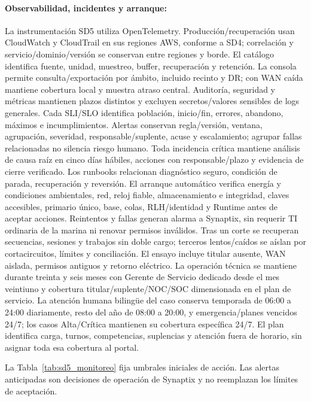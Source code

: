\paragraph{Observabilidad, incidentes y arranque:}
La instrumentación SD5 utiliza OpenTelemetry. Producción/recuperación usan CloudWatch y CloudTrail en sus regiones AWS, conforme a SD4; correlación y servicio/dominio/versión se conservan entre regiones y borde. El catálogo identifica fuente, unidad, muestreo, buffer, recuperación y retención. La consola permite consulta/exportación por ámbito, incluido recinto y DR; con WAN caída mantiene cobertura local y muestra atraso central. Auditoría, seguridad y métricas mantienen plazos distintos y excluyen secretos/valores sensibles de logs generales.
Cada SLI/SLO identifica población, inicio/fin, errores, abandono, máximos e incumplimientos. Alertas conservan regla/versión, ventana, agrupación, severidad, responsable/suplente, acuse y escalamiento; agrupar fallas relacionadas no silencia riesgo humano. Toda incidencia crítica mantiene análisis de causa raíz en cinco días hábiles, acciones con responsable/plazo y evidencia de cierre verificado. Los runbooks relacionan diagnóstico seguro, condición de parada, recuperación y reversión.
El arranque automático verifica energía y condiciones ambientales, red, reloj fiable, almacenamiento e integridad, claves accesibles, primario único, base, colas, RLH/identidad y Runtime antes de aceptar acciones. Reintentos y fallas generan alarma a Synaptix, sin requerir TI ordinaria de la marina ni renovar permisos inválidos. Tras un corte se recuperan secuencias, sesiones y trabajos sin doble cargo; terceros lentos/caídos se aíslan por cortacircuitos, límites y conciliación. El ensayo incluye titular ausente, WAN aislada, permisos antiguos y retorno eléctrico.
La operación técnica se mantiene durante treinta y seis meses con Gerente de Servicio dedicado desde el mes veintiuno y cobertura titular/suplente/NOC/SOC dimensionada en el plan de servicio. La atención humana bilingüe del caso conserva temporada de 06:00 a 24:00 diariamente, resto del año de 08:00 a 20:00, y emergencia/planes vencidos 24/7; los casos Alta/Crítica mantienen su cobertura específica 24/7. El plan identifica carga, turnos, competencias, suplencias y atención fuera de horario, sin asignar toda esa cobertura al portal.

La Tabla~\ref{tab:sd5_monitoreo} fija umbrales iniciales de acción. Las alertas anticipadas son decisiones de operación de Synaptix y no reemplazan los límites de aceptación.

